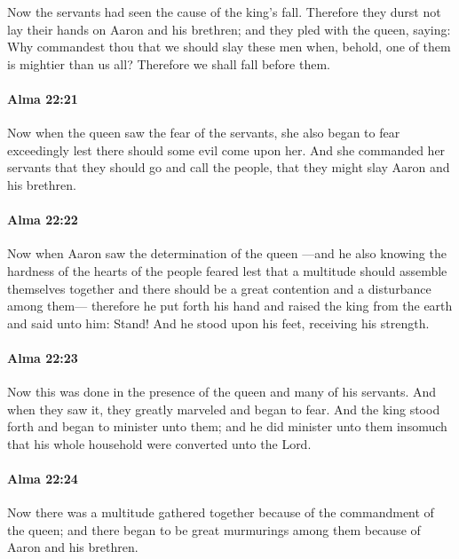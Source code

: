 			Now the servants had seen the cause of the king's fall.
			Therefore they durst not lay their hands on Aaron and his brethren;
			and they pled with the queen, saying:
			Why commandest thou that we should slay these men
			when, behold, one of them is mightier than us all?
			Therefore we shall fall before them.

		\paragraph{Alma 22:21} %
			\label{ALMA-22-21}

			Now when the queen saw the fear of the servants,
			she also began to fear exceedingly
			lest there should some evil come upon her.
			And she commanded her servants that they should go and call the people,
			that they might slay Aaron and his brethren.

		\paragraph{Alma 22:22} %
			\label{ALMA-22-22}

			Now when Aaron saw the determination of the queen
			---and he also knowing the hardness of the hearts of the people
			feared lest that a multitude should assemble themselves together
			and there should be a great contention and a disturbance among them---
			therefore he put forth his hand and raised the king from the earth
			and said unto him: Stand!
			And he stood upon his feet, receiving his strength.

		\paragraph{Alma 22:23} %
			\label{ALMA-22-23}

			Now this was done in the presence of the queen and many of his servants.
			And when they saw it, they greatly marveled and began to fear.
			And the king stood forth and began to minister unto them;
			and he did minister unto them
			insomuch that his whole household were converted unto the Lord.

		\paragraph{Alma 22:24} %
			\label{ALMA-22-24}

			Now there was a multitude gathered together
			because of the commandment of the queen;
			and there began to be great murmurings among them
			because of Aaron and his brethren.

